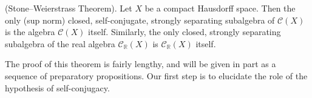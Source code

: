(Stone–Weierstrass Theorem). Let $X$ be a compact Hausdorff space. Then the only (sup norm) closed, self-conjugate, strongly separating subalgebra of $\mathcal{C}(X)$ is the algebra $\mathcal{C}(X)$ itself. Similarly, the only closed, strongly separating subalgebra of the real algebra $\mathcal{C}_{\mathbb{R}}(X)$ is $\mathcal{C}_{\mathbb{R}}(X)$ itself.

The proof of this theorem is fairly lengthy, and will be given in part as a sequence of preparatory propositions. Our first step is to elucidate the role of the hypothesis of self-conjugacy.
